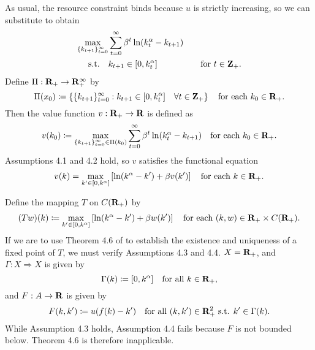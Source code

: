 \documentclass[11pt,letterpaper,reqno,oneside]{article}
\begin{document}
As usual, the resource constraint binds because $u$ is strictly increasing, so we can substitute to obtain
%
\begin{align*}
	\max_{\{k_{t+1}\}_{t=0}^\infty} 
	& \sum_{t=0}^\infty \beta^t \ln ( k_t^\alpha - k_{t+1} ) &
	\\
	\text{s.t.}\quad
	& k_{t+1} \in [0,k_t^\alpha] & \quad\text{for $t \in \mathbf{Z}_+$} .
\end{align*}
%
Define $\Pi : \mathbf{R}_+ \to \mathbf{R}_+^\infty$ by
%
\begin{equation*}
	\Pi(x_0) \coloneqq \left\{
	\{ k_{t+1} \}_{t=0}^\infty : 
	k_{t+1} \in [0,k_t^\alpha] \quad \forall t \in \mathbf{Z}_+ \right\}
	\quad\text{for each $k_0 \in \mathbf{R}_+$} .
\end{equation*}
%
Then the value function $v : \mathbf{R}_+ \to \mathbf{R}$ is defined as
%
\begin{equation*}
	v(k_0) \coloneqq
	\max_{ \{ k_{t+1} \}_{t=0}^\infty \in \Pi(k_0) }
	\sum_{t=0}^\infty \beta^t \ln ( k_t^\alpha - k_{t+1} )
	\quad\text{for each $k_0 \in \mathbf{R}_+$} .
\end{equation*}
%
Assumptions 4.1 and 4.2 hold, so $v$ satisfies the functional equation
%
\begin{equation*}
	v(k) = 
	\max_{ k' \in [0,k^\alpha] } \left[
	\ln ( k^\alpha - k' ) + \beta v(k') \right]
	\quad\text{for each $k \in \mathbf{R}_+$} .
\end{equation*}

Define the mapping $T$ on $C(\mathbf{R}_+)$ by
%
\begin{equation*}
	(Tw)(k) \coloneqq 
	\max_{ k' \in [0,k^\alpha] } \left[
	\ln ( k^\alpha - k' ) + \beta w(k') \right]
	\quad\text{for each $(k,w) \in \mathbf{R}_+ \times C(\mathbf{R}_+)$} .
\end{equation*}
%
If we are to use Theorem 4.6 of \textcite{StokeyLucasPrescott1989} to establish the existence and uniqueness of a fixed point of $T$, we must verify Assumptions 4.3 and 4.4. $X=\mathbf{R}_+$, and $\Gamma : X \Rightarrow X$ is given by
%
\begin{equation*}
	\Gamma(k)
	\coloneqq [0,k^\alpha]
	\quad\text{for all $k \in \mathbf{R}_+$} ,
\end{equation*}
%
and $F : A \to \mathbf{R}$ is given by
%
\begin{equation*}
	F(k,k') 
	\coloneqq u( f(k) - k' )
	\quad\text{for all $(k,k') \in \mathbf{R}_+^2$ s.t. $k' \in \Gamma(k)$} .
\end{equation*}
%
While Assumption 4.3 holds, Assumption 4.4 fails because $F$ is not bounded below. Theorem 4.6 is therefore inapplicable.
\end{document}
